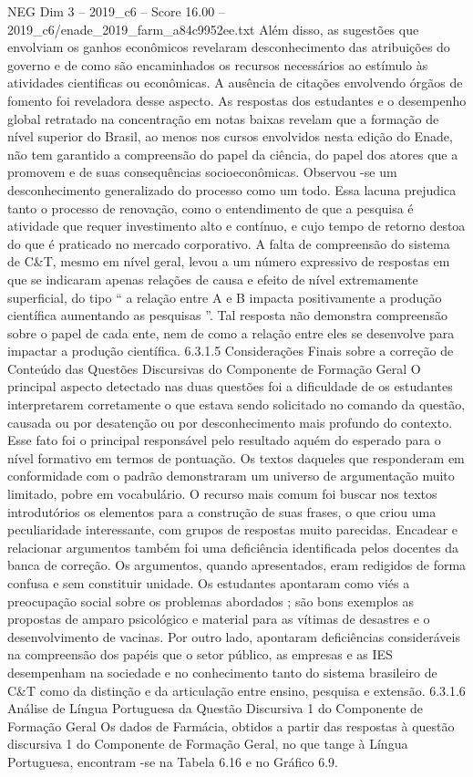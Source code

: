 \begin{textsample}{NEG Dim 3 – 2019\_c6 – Score 16.00 – 2019\_c6/enade\_2019\_farm\_a84c9952ee.txt}
Além disso, as sugestões que envolviam os ganhos econômicos revelaram desconhecimento das atribuições do governo e de como são encaminhados os recursos necessários ao estímulo às atividades cientificas ou econômicas.
A ausência de citações envolvendo órgãos de fomento foi reveladora desse aspecto.
As respostas dos estudantes e o desempenho global retratado na concentração em notas baixas revelam que a formação de nível superior do Brasil, ao menos nos cursos envolvidos nesta edição do Enade, não tem garantido a compreensão do papel da ciência, do papel dos atores que a promovem e de suas consequências socioeconômicas.
Observou -se um desconhecimento generalizado do processo como um todo.
Essa lacuna prejudica tanto o processo de renovação, como o entendimento de que a pesquisa é atividade que requer investimento alto e contínuo, e cujo tempo de retorno destoa do que é praticado no mercado corporativo.
A falta de compreensão do sistema de C\&T, mesmo em nível geral, levou a um número expressivo de respostas em que se indicaram apenas relações de causa e efeito de nível extremamente superficial, do tipo “ a relação entre A e B impacta positivamente a produção científica aumentando as pesquisas ”.
Tal resposta não demonstra compreensão sobre o papel de cada ente, nem de como a relação entre eles se desenvolve para impactar a produção científica. 6.3.1.5 Considerações Finais sobre a correção de Conteúdo das Questões Discursivas do Componente de Formação Geral O principal aspecto detectado nas duas questões foi a dificuldade de os estudantes interpretarem corretamente o que estava sendo solicitado no comando da questão, causada ou por desatenção ou por desconhecimento mais profundo do contexto.
Esse fato foi o principal responsável pelo resultado aquém do esperado para o nível formativo em termos de pontuação.
Os textos daqueles que responderam em conformidade com o padrão demonstraram um universo de argumentação muito limitado, pobre em vocabulário.
O recurso mais comum foi buscar nos textos introdutórios os elementos para a construção de suas frases, o que criou uma peculiaridade interessante, com grupos de respostas muito parecidas.
Encadear e relacionar argumentos também foi uma deficiência identificada pelos docentes da banca de correção.
Os argumentos, quando apresentados, eram redigidos de forma confusa e sem constituir unidade.
Os estudantes apontaram como viés a preocupação social sobre os problemas abordados ; são bons exemplos as propostas de amparo psicológico e material para as vítimas de desastres e o desenvolvimento de vacinas.
Por outro lado, apontaram deficiências consideráveis na compreensão dos papéis que o setor público, as empresas e as IES desempenham na sociedade e no conhecimento tanto do sistema brasileiro de C\&T como da distinção e da articulação entre ensino, pesquisa e extensão. 6.3.1.6 Análise de Língua Portuguesa da Questão Discursiva 1 do Componente de Formação Geral Os dados de Farmácia, obtidos a partir das respostas à questão discursiva 1 do Componente de Formação Geral, no que tange à Língua Portuguesa, encontram -se na Tabela 6.16 e no Gráfico 6.9.

\end{textsample}
